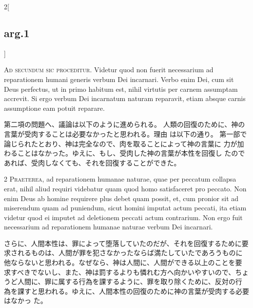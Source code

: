 \documentclass[paper=a4paper,fontsize=10pt,jafontsize=9pt,titlepage]{jlreq}
\begin{document}
\begin{paracol}{2}[\subsection{arg.1}]

{\Huge A}{\scshape d secundum sic proceditur}. Videtur quod non fuerit
 necessarium ad reparationem humani generis verbum Dei incarnari. Verbo
 enim Dei, cum sit Deus perfectus, ut in primo habitum est, nihil
 virtutis per carnem assumptam accrevit. Si ergo verbum Dei incarnatum
 naturam reparavit, etiam absque carnis assumptione eam potuit reparare.

\switchcolumn

第二項の問題へ、議論は以下のように進められる。
人類の回復のために、神の言葉が受肉することは必要なかったと思われる。理由
 は以下の通り。
第一部で論じられたとおり、神は完全なので、肉を取ることによって神の言葉に
 力が加わることはなかった。ゆえに、もし、受肉した神の言葉が本性を回復し
 たのであれば、受肉しなくても、それを回復することができた。


{\scshape 2 Praeterea}, ad reparationem humanae naturae, quae per
 peccatum collapsa erat, nihil aliud requiri videbatur quam quod homo
 satisfaceret pro peccato. Non enim Deus ab homine requirere plus debet
 quam possit, et, cum pronior sit ad miserendum quam ad puniendum, sicut
 homini imputat actum peccati, ita etiam videtur quod ei imputet ad
 deletionem peccati actum contrarium. Non ergo fuit necessarium ad
 reparationem humanae naturae verbum Dei incarnari.

\switchcolumn

さらに、人間本性は、罪によって堕落していたのだが、それを回復するために要
 求されるものは、人間が罪を犯さなかったならば満たしていたであろうものに
 他ならないと思われる。なぜなら、神は人間に、人間ができる以上のことを要
 求すべきでないし、また、神は罰するよりも憐れむ方へ向かいやすいので、ちょ
 うど人間に、罪に属する行為を課するように、罪を取り除くために、反対の行
 為を課すと思われる。ゆえに、人間本性の回復のために神の言葉が受肉する必要はなかっ
 た。



\end{paracol}
\end{document}
